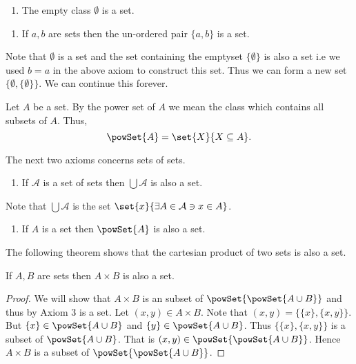 \begin{enumerate}[label=\bfseries Axiom 4:]
    \item The empty class $\emptyset$ is a set.
\end{enumerate}

\begin{enumerate}[label=\bfseries Axiom 5:]
    \item If $a,b$ are sets then the un-ordered pair $\lbrace a , b \rbrace$ is a set. 
\end{enumerate}

Note that $\emptyset$ is a set and the set containing the emptyset $\lbrace{\emptyset}\rbrace$ is
also a set i.e we used $b = a$ in the above axiom to construct this set. 
Thus we can form a new set $\lbrace \emptyset,\lbrace \emptyset \rbrace \rbrace$. We can
continue this forever.

\begin{Definition}
    Let $A$ be a set. By the power set of $A$ we mean the class which contains all subsets of $A$.
    Thus,
    \begin{equation*}
	\powSet{A} = \set{X}{X \subseteq A}.
    \end{equation*}
\end{Definition}

The next two axioms concerns sets of sets. 

\begin{enumerate}[label=\bfseries Axiom 6:]
    \item If $\mathcal{A}$ is a set of sets then $\bigcup \mathcal{A}$ is also a set.
\end{enumerate}
Note that $\bigcup{\mathcal{A}}$ is the set $\set{x}{\exists A \in \mathcal{A} \ni x \in A}$.

\begin{enumerate}[label=\bfseries Axiom 7:]
    \item If $A$ is a set then $\powSet{A}$ is also a set.
\end{enumerate}

The following theorem shows that the cartesian product of two sets is also a set.
\begin{Theorem}
    If $A,B$ are sets then $A \times B$ is also a set.
\end{Theorem}
\begin{proof}
    We will show that $A \times B$ is an subset of $\powSet{\powSet{A\cup B}}$
    and thus by Axiom $3$ is a set.
    Let $(x,y) \in A \times B$. Note that $(x,y) = \lbrace \lbrace x \rbrace, \lbrace x,y \rbrace
    \rbrace$. But $\lbrace x \rbrace \in \powSet{A \cup B}$ and $\lbrace y \rbrace \in
    \powSet{A \cup B}$.
    Thus $\lbrace \lbrace x \rbrace, \lbrace x,y \rbrace \rbrace$ is a subset of $\powSet{A\cup B}$. 
    That is $(x,y) \in \powSet{\powSet{A\cup B}}$. Hence $A \times B$ is a subset of 
    $\powSet{\powSet{A\cup B}}$.
\end{proof}

